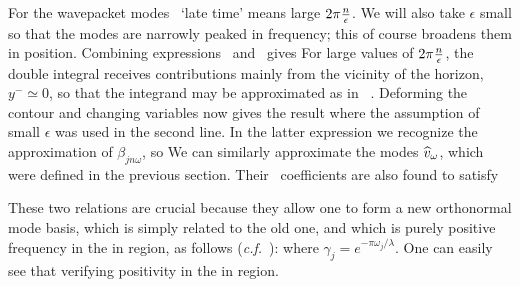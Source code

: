 For the wavepacket modes \wpm\ `late time'
means large $2\pi {n\over\epsilon}$.
We will also take
$\epsilon$ small so that the modes are narrowly peaked in frequency; this of
course broadens them in position.
Combining expressions \inprod\ and \wpbog\ gives
%
\eqn{}
%
For large values of $2\pi {n\over\epsilon} $, the double integral
receives contributions mainly from the vicinity of the horizon,
$y^{-} \simeq 0$, so that the
integrand may be approximated as in \lbog\ .
Deforming the contour and changing variables now gives
the result
%
\eqn{}
%
where the assumption of small $\epsilon$ was used in the second line.
In the latter expression we recognize the approximation of
$\beta_{jn\omega}$, so
%
\eqn{}
%
We can similarly approximate the modes ${\widehat v}_{\omega}$, which were
defined in the previous section. Their \Bog\ coefficients are also
found to satisfy
%
\eqn{}
%

These two relations are crucial because they allow one to form a new
 orthonormal mode basis, which is simply related to the old one, and
which is purely
positive frequency in the in region, as follows
({\it c.f.}~):
%
\eqn{}
%
where $\gamma_{j}=e^{-{\pi\omega_{j}/\lambda}} .$ One can easily see that
%
\eqn{}
%
verifying positivity in the in region.

